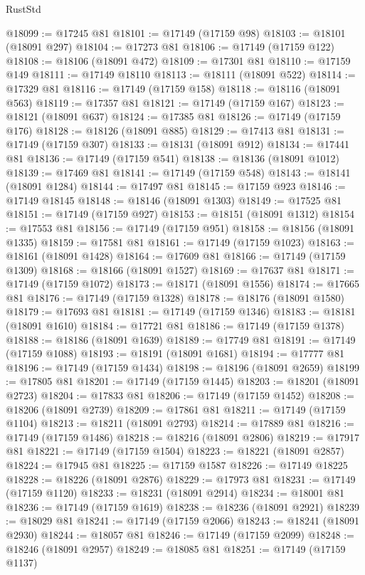 \begin{lexlean}{RustStd}
\begin{coremodule}
@18099 := @17245 @81
@18101 := @17149 (@17159 @98)
@18103 := @18101 (@18091 @297)
@18104 := @17273 @81
@18106 := @17149 (@17159 @122)
@18108 := @18106 (@18091 @472)
@18109 := @17301 @81
@18110 := @17159 @149
@18111 := @17149 @18110
@18113 := @18111 (@18091 @522)
@18114 := @17329 @81
@18116 := @17149 (@17159 @158)
@18118 := @18116 (@18091 @563)
@18119 := @17357 @81
@18121 := @17149 (@17159 @167)
@18123 := @18121 (@18091 @637)
@18124 := @17385 @81
@18126 := @17149 (@17159 @176)
@18128 := @18126 (@18091 @885)
@18129 := @17413 @81
@18131 := @17149 (@17159 @307)
@18133 := @18131 (@18091 @912)
@18134 := @17441 @81
@18136 := @17149 (@17159 @541)
@18138 := @18136 (@18091 @1012)
@18139 := @17469 @81
@18141 := @17149 (@17159 @548)
@18143 := @18141 (@18091 @1284)
@18144 := @17497 @81
@18145 := @17159 @923
@18146 := @17149 @18145
@18148 := @18146 (@18091 @1303)
@18149 := @17525 @81
@18151 := @17149 (@17159 @927)
@18153 := @18151 (@18091 @1312)
@18154 := @17553 @81
@18156 := @17149 (@17159 @951)
@18158 := @18156 (@18091 @1335)
@18159 := @17581 @81
@18161 := @17149 (@17159 @1023)
@18163 := @18161 (@18091 @1428)
@18164 := @17609 @81
@18166 := @17149 (@17159 @1309)
@18168 := @18166 (@18091 @1527)
@18169 := @17637 @81
@18171 := @17149 (@17159 @1072)
@18173 := @18171 (@18091 @1556)
@18174 := @17665 @81
@18176 := @17149 (@17159 @1328)
@18178 := @18176 (@18091 @1580)
@18179 := @17693 @81
@18181 := @17149 (@17159 @1346)
@18183 := @18181 (@18091 @1610)
@18184 := @17721 @81
@18186 := @17149 (@17159 @1378)
@18188 := @18186 (@18091 @1639)
@18189 := @17749 @81
@18191 := @17149 (@17159 @1088)
@18193 := @18191 (@18091 @1681)
@18194 := @17777 @81
@18196 := @17149 (@17159 @1434)
@18198 := @18196 (@18091 @2659)
@18199 := @17805 @81
@18201 := @17149 (@17159 @1445)
@18203 := @18201 (@18091 @2723)
@18204 := @17833 @81
@18206 := @17149 (@17159 @1452)
@18208 := @18206 (@18091 @2739)
@18209 := @17861 @81
@18211 := @17149 (@17159 @1104)
@18213 := @18211 (@18091 @2793)
@18214 := @17889 @81
@18216 := @17149 (@17159 @1486)
@18218 := @18216 (@18091 @2806)
@18219 := @17917 @81
@18221 := @17149 (@17159 @1504)
@18223 := @18221 (@18091 @2857)
@18224 := @17945 @81
@18225 := @17159 @1587
@18226 := @17149 @18225
@18228 := @18226 (@18091 @2876)
@18229 := @17973 @81
@18231 := @17149 (@17159 @1120)
@18233 := @18231 (@18091 @2914)
@18234 := @18001 @81
@18236 := @17149 (@17159 @1619)
@18238 := @18236 (@18091 @2921)
@18239 := @18029 @81
@18241 := @17149 (@17159 @2066)
@18243 := @18241 (@18091 @2930)
@18244 := @18057 @81
@18246 := @17149 (@17159 @2099)
@18248 := @18246 (@18091 @2957)
@18249 := @18085 @81
@18251 := @17149 (@17159 @1137)

\end{coremodule}
\end{lexlean}
